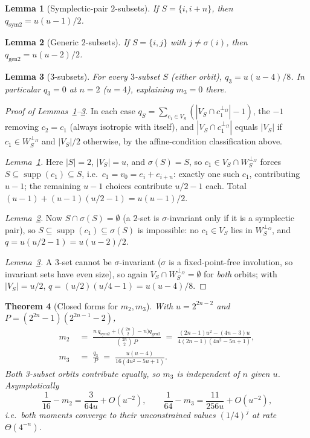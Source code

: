 \documentclass[11pt,a4paper]{article}
\theoremstyle{plain}
\newtheorem{theorem}{Theorem}[section]
\newtheorem{lemma}[theorem]{Lemma}
\theoremstyle{definition}
\begin{document}
\begin{lemma}[Symplectic-pair $2$-subsets]
\label{lem:sym2}
If $S = \{i, i+n\}$, then $q_{\mathrm{sym2}} = u(u-1)/2$.
\end{lemma}

\begin{lemma}[Generic $2$-subsets]
\label{lem:gen2}
If $S = \{i,j\}$ with $j \neq \sigma(i)$, then $q_{\mathrm{gen2}} = u(u-2)/2$.
\end{lemma}

\begin{lemma}[$3$-subsets]
\label{lem:three}
For every $3$-subset $S$ (either orbit), $q_{3} = u(u-4)/8$. In particular $q_3 = 0$ at $n=2$ ($u=4$), explaining $m_3 = 0$ there.
\end{lemma}

\begin{proof}[Proof of Lemmas~\ref{lem:sym2}--\ref{lem:three}]
In each case $q_S = \sum_{c_1 \in V_S}(|V_S \cap c_1^{\perp_\Omega}| - 1)$, the $-1$ removing $c_2 = c_1$ (always isotropic with itself), and $|V_S \cap c_1^{\perp_\Omega}|$ equals $|V_S|$ if $c_1 \in W_S^{\perp_\Omega}$ and $|V_S|/2$ otherwise, by the affine-condition classification above.

\emph{Lemma~\ref{lem:sym2}.} Here $|S|=2$, $|V_S| = u$, and $\sigma(S) = S$, so $c_1 \in V_S \cap W_S^{\perp_\Omega}$ forces $S \subseteq \operatorname{supp}(c_1) \subseteq S$, i.e.\ $c_1 = v_0 = e_i + e_{i+n}$: exactly one such $c_1$, contributing $u-1$; the remaining $u-1$ choices contribute $u/2-1$ each. Total $(u-1) + (u-1)(u/2-1) = u(u-1)/2$.

\emph{Lemma~\ref{lem:gen2}.} Now $S \cap \sigma(S) = \emptyset$ (a $2$-set is $\sigma$-invariant only if it is a symplectic pair), so $S \subseteq \operatorname{supp}(c_1) \subseteq \sigma(S)$ is impossible: no $c_1 \in V_S$ lies in $W_S^{\perp_\Omega}$, and $q = u(u/2-1) = u(u-2)/2$.

\emph{Lemma~\ref{lem:three}.} A $3$-set cannot be $\sigma$-invariant ($\sigma$ is a fixed-point-free involution, so invariant sets have even size), so again $V_S \cap W_S^{\perp_\Omega} = \emptyset$ for \emph{both} orbits; with $|V_S| = u/2$, $q = (u/2)(u/4-1) = u(u-4)/8$.
\end{proof}

\begin{theorem}[Closed forms for $m_2, m_3$]
\label{thm:mj-closed}
With $u = 2^{2n-2}$ and $P = (2^{2n}-1)(2^{2n-1}-2)$,
\begin{align*}
m_2 \;&=\; \frac{n\,q_{\mathrm{sym2}} + \bigl(\binom{2n}{2}-n\bigr)q_{\mathrm{gen2}}}{\binom{2n}{2}\,P}
\;=\; \frac{(2n-1)u^2-(4n-3)u}{4(2n-1)(4u^2-5u+1)},\\
m_3 \;&=\; \frac{q_3}{P} \;=\; \frac{u(u-4)}{16(4u^2-5u+1)}.
\end{align*}
Both 3-subset orbits contribute equally, so $m_3$ is independent of $n$ given $u$. Asymptotically
\[
\frac{1}{16} - m_2 = \frac{3}{64u} + O(u^{-2}), \qquad
\frac{1}{64} - m_3 = \frac{11}{256u} + O(u^{-2}),
\]
i.e.\ both moments converge to their unconstrained values $(1/4)^j$ at rate $\Theta(4^{-n})$.
\end{theorem}
\end{document}
